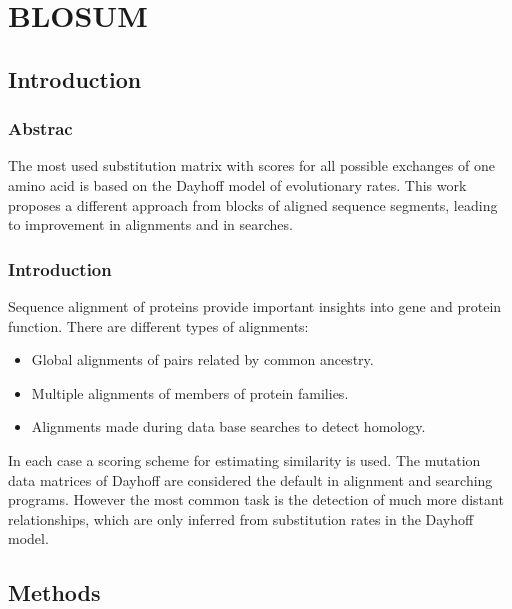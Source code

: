 \chapter{BLOSUM}

\section{Introduction}

	\subsection{Abstrac}
	The most used substitution matrix with scores for all possible exchanges of one amino acid is based on the Dayhoff model of evolutionary rates.
	This work proposes a different approach from blocks of aligned sequence segments, leading to improvement in alignments and in searches.

	\subsection{Introduction}
	Sequence alignment of proteins provide important insights into gene and protein function.
	There are different types of alignments:

	\begin{multicols}{2}
		\begin{itemize}
			\item Global alignments of pairs related by common ancestry.
			\item Multiple alignments of members of protein families.
			\item Alignments made during data base searches to detect homology.
		\end{itemize}
	\end{multicols}

	In each case a scoring scheme for estimating similarity is used.
	The mutation data matrices of Dayhoff are considered the default in alignment and searching programs.
	However the most common task is the detection of much more distant relationships, which are only inferred from substitution rates in the Dayhoff model.

\section{Methods}

